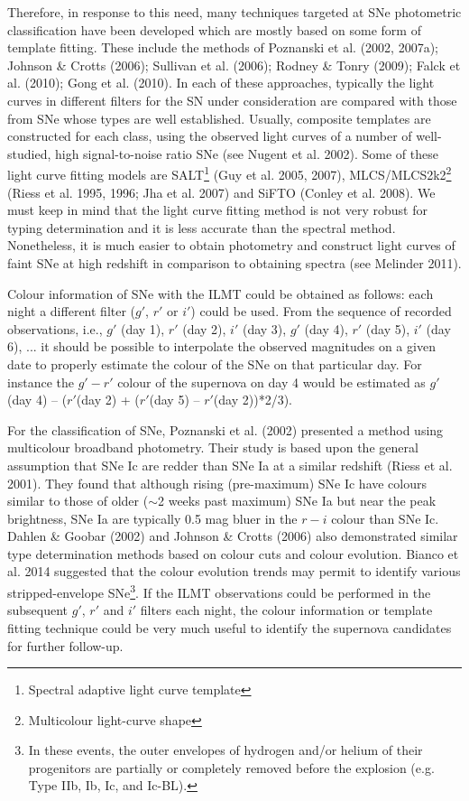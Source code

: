 \documentclass[12pt,a4paper]{article}
\begin{document}
Therefore, in response to this need, many techniques targeted at SNe photometric classification have 
been developed which are mostly based on some form of template fitting. These include the methods of 
Poznanski et al. (2002, 2007a); Johnson \& Crotts (2006); Sullivan et al. (2006); Rodney \& Tonry (2009); 
Falck et al. (2010); Gong et al. (2010).
In each of these approaches, typically the light curves in different filters for the SN under 
consideration are compared with those from SNe whose types are well established. Usually, composite 
templates are constructed for each class, using the observed light curves of a number of well-studied, 
high signal-to-noise ratio SNe (see Nugent et al. 2002).  
Some of these light curve fitting models are SALT\footnote{Spectral adaptive light curve template} 
(Guy et al. 2005, 2007), MLCS/MLCS2k2\footnote{Multicolour light-curve shape} (Riess et al. 1995, 
1996; Jha et al. 2007) and SiFTO (Conley et al. 2008).
We must keep in mind that the light curve fitting method is not very robust for typing 
determination and it is less accurate than the spectral method. Nonetheless, it is much easier 
to obtain photometry and construct light curves of faint SNe at high redshift in comparison to 
obtaining spectra (see Melinder 2011). 

Colour information of SNe with the ILMT could be obtained as follows: each night a different filter
($g'$, $r'$ or $i'$) could be used. From the sequence of recorded observations, i.e., $g'$ (day 1), 
$r'$ (day 2), $i'$ (day 3), $g'$ (day 4), $r'$ (day 5), $i'$ (day 6), ... it should be possible to 
interpolate the observed magnitudes on a given date to properly estimate the colour of the SNe on 
that particular day.
For instance the $g'-r'$ colour of the supernova on day 4 would be estimated as 
$g'$(day 4) -- ($r'$(day 2) + ($r'$(day 5) -- $r'$(day 2))*2/3).

For the classification of SNe, Poznanski et al. (2002) presented a method using multicolour 
broadband photometry. Their study is based upon the general assumption that SNe Ic are redder
than SNe Ia at a similar redshift (Riess et al. 2001).
They found that although rising (pre-maximum) SNe Ic have colours similar to those of older 
($\sim$2 weeks past maximum) SNe Ia but near the peak brightness, SNe Ia are typically 0.5 
mag bluer in the $r-i$ colour than SNe Ic. 
Dahlen \& Goobar (2002) and Johnson \& Crotts (2006) also demonstrated similar type determination
methods based on colour cuts and colour evolution.
Bianco et al. 2014 suggested that the colour evolution trends may permit to identify various 
stripped-envelope SNe\footnote{In these events, the outer envelopes of hydrogen and/or helium 
of their progenitors are partially or completely removed before the explosion (e.g. Type IIb, Ib, 
Ic, and Ic-BL).}.
If the ILMT observations could be performed in the subsequent $g'$, $r'$ and $i'$ filters each night, 
the colour information or template fitting technique could be very much useful
to identify the supernova candidates for further follow-up.
\end{document}

